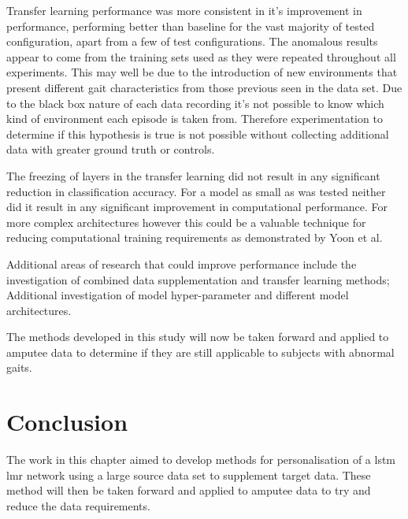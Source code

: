 Transfer learning performance was more consistent in it's improvement in performance, performing better than baseline for the vast majority of tested configuration, apart from a few of test configurations. The anomalous results appear to come from the training sets used as they were repeated throughout all experiments. This may well be due to the introduction of new environments that present different gait characteristics from those previous seen in the data set. Due to the black box nature of each data recording it's not possible to know which kind of environment each episode is taken from. Therefore experimentation to determine if this hypothesis is true is not possible without collecting additional data with greater ground truth or controls.

The freezing of layers in the transfer learning did not result in any significant reduction in classification accuracy. For a model as small as was tested neither did it result in any significant improvement in computational performance. For more complex architectures however this could be a valuable technique for reducing computational training requirements as demonstrated by Yoon et al\cite{Yoon2017}.

Additional areas of research that could improve performance include the investigation of combined data supplementation and transfer learning methods; Additional investigation of model hyper-parameter and different model architectures.

The methods developed in this study will now be taken forward and applied to amputee data to determine if they are still applicable to subjects with abnormal gaits.

\section{Conclusion}
\label{sec:personalisation-conclusions}
The work in this chapter aimed to develop methods for personalisation of a \acrshort{lstm} \acrshort{lmr} network using a large source data set to supplement target data. These method will then be taken forward and applied to amputee data to try and reduce the data requirements.

